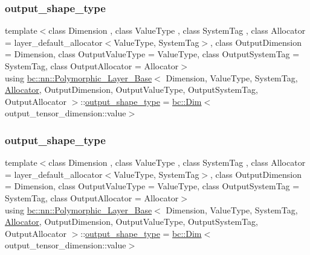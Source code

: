 \subsubsection{\texorpdfstring{output\+\_\+shape\+\_\+type}{output\_shape\_type}\hspace{0.1cm}{\footnotesize\ttfamily [1/2]}}
{\footnotesize\ttfamily template$<$class Dimension , class Value\+Type , class System\+Tag , class Allocator  = layer\+\_\+default\+\_\+allocator$<$\+Value\+Type, System\+Tag$>$, class Output\+Dimension  = Dimension, class Output\+Value\+Type  = Value\+Type, class Output\+System\+Tag  = System\+Tag, class Output\+Allocator  = Allocator$>$ \\
using \hyperlink{structbc_1_1nn_1_1Polymorphic__Layer__Base}{bc\+::nn\+::\+Polymorphic\+\_\+\+Layer\+\_\+\+Base}$<$ Dimension, Value\+Type, System\+Tag, \hyperlink{classbc_1_1allocators_1_1Allocator}{Allocator}, Output\+Dimension, Output\+Value\+Type, Output\+System\+Tag, Output\+Allocator $>$\+::\hyperlink{structbc_1_1nn_1_1Polymorphic__Layer__Base_a130df92a457150349fe554eeee4dd32a}{output\+\_\+shape\+\_\+type} =  \hyperlink{structbc_1_1Dim}{bc\+::\+Dim}$<$output\+\_\+tensor\+\_\+dimension\+::value$>$}

\mbox{\label{structbc_1_1nn_1_1Polymorphic__Layer__Base_a130df92a457150349fe554eeee4dd32a}} 
\subsubsection{\texorpdfstring{output\+\_\+shape\+\_\+type}{output\_shape\_type}\hspace{0.1cm}{\footnotesize\ttfamily [2/2]}}
{\footnotesize\ttfamily template$<$class Dimension , class Value\+Type , class System\+Tag , class Allocator  = layer\+\_\+default\+\_\+allocator$<$\+Value\+Type, System\+Tag$>$, class Output\+Dimension  = Dimension, class Output\+Value\+Type  = Value\+Type, class Output\+System\+Tag  = System\+Tag, class Output\+Allocator  = Allocator$>$ \\
using \hyperlink{structbc_1_1nn_1_1Polymorphic__Layer__Base}{bc\+::nn\+::\+Polymorphic\+\_\+\+Layer\+\_\+\+Base}$<$ Dimension, Value\+Type, System\+Tag, \hyperlink{classbc_1_1allocators_1_1Allocator}{Allocator}, Output\+Dimension, Output\+Value\+Type, Output\+System\+Tag, Output\+Allocator $>$\+::\hyperlink{structbc_1_1nn_1_1Polymorphic__Layer__Base_a130df92a457150349fe554eeee4dd32a}{output\+\_\+shape\+\_\+type} =  \hyperlink{structbc_1_1Dim}{bc\+::\+Dim}$<$output\+\_\+tensor\+\_\+dimension\+::value$>$}

